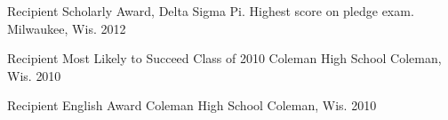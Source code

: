 



\begin{cvhonors}

  \cvhonor
    {Recipient} %
    {Scholarly Award, Delta Sigma Pi. Highest score on pledge exam.} %
    {Milwaukee, Wis.} %
    {2012} %

  \cvhonor
    {Recipient} %
    {Most Likely to Succeed Class of 2010 Coleman High School} %
    {Coleman, Wis.} %
    {2010} %

  \cvhonor
    {Recipient} %
    {English Award Coleman High School} %
    {Coleman, Wis.} %
    {2010} %

\end{cvhonors}

